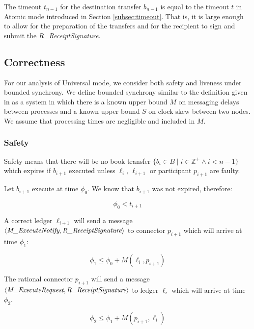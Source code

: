 \documentclass[letterpaper,twocolumn,10pt]{article}
\begin{document}
The timeout $t_{n-1}$ for the destination transfer $b_{n-1}$ is equal to the timeout $t$ in Atomic mode introduced in Section \ref{subsec:timeout}. That is, it is large enough to allow for the preparation of the transfers and for the recipient to sign and submit the \textit{R\_ReceiptSignature}.


\subsection{Correctness}

For our analysis of Universal mode, we consider both safety and liveness under bounded synchrony. We define bounded synchrony similar to the definition given in \cite{dwork1988consensus} as a system in which there is a known upper bound $M$ on messaging delays between processes and a known upper bound $S$ on clock skew between two nodes. We assume that processing times are negligible and included in $M$.


\subsubsection{Safety}

Safety means that there will be no book transfer $ \{ b_i \in B \mid i \in \mathbb{Z}^+ \land i < n-1 \} $ which expires if $b_{i+1}$ executed unless $\ell_i$, $\ell_{i+1}$ or participant $p_{i+1}$ are faulty.

Let $b_{i+1}$ execute at time $\phi_0$. We know that $b_{i+1}$ was not expired, therefore:

\begin{equation}
\label{eq:phi0}
\phi_0 < t_{i+1}
\end{equation}

A correct ledger $\ell_{i+1}$ will send a message $\langle \textit{M\_ExecuteNotify}, \textit{R\_ReceiptSignature} \rangle$ to connector $p_{i+1}$ which will arrive at time $\phi_1$:

\begin{equation}
\label{eq:phi1}
\phi_1 \leq \phi_0 + M(\ell_i, p_{i+1})
\end{equation}

The rational connector $p_{i+1}$ will send a message $\langle \textit{M\_ExecuteRequest}, \textit{R\_ReceiptSignature} \rangle$ to ledger $\ell_i$ which will arrive at time $\phi_2$.

\begin{equation}
\label{eq:phi2}
\phi_2 \leq \phi_1 + M(p_{i+1}, \ell_i)
\end{equation}
\end{document}
